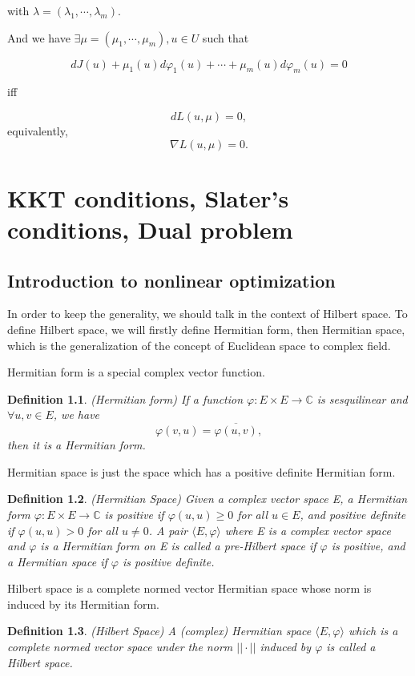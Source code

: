\documentclass[a4paper]{report}
\newtheorem{definition}{Definition}[section]
\begin{document}
with $\lambda=(\lambda_1,\cdots,\lambda_m)$. 

And we have $\exists \mu=(\mu_1,\cdots,\mu_m), u\in U$ such that

\[
    dJ(u)+\mu_1(u)d\varphi_1(u)+\cdots+\mu_m(u)d\varphi_m(u)=0
\]

iff

\[
    dL(u,\mu)=0,
\]
equivalently,
\[
    \nabla L(u,\mu)=0.
\]


\chapter{KKT conditions, Slater's conditions, Dual problem}
\section{Introduction to nonlinear optimization}
In order to keep the generality, we should talk in the context of Hilbert space. To define Hilbert space, we will firstly define Hermitian form, then Hermitian space, which is the generalization of the concept of Euclidean space to complex field.

Hermitian form is a special complex vector function.
\begin{definition}
    (Hermitian form\cite{gallier2019algebra}) If a function $\varphi :E\times E\to \mathbb C$ is sesquilinear and $\forall u,v\in E$, we have 
    \[
        \varphi(v,u)=\overline{\varphi(u,v)},
    \]
    then it is a Hermitian form.
\end{definition}

Hermitian space is just the space which has a positive definite Hermitian form.

\begin{definition}
    (Hermitian Space\cite{gallier2019algebra}) Given a complex vector space E, a Hermitian form $\varphi:E\times E\to \mathbb C$ is positive if $\varphi(u,u)\geq 0$ for all $u\in E$, and positive definite if $\varphi(u,u)>0$ for all $u\neq 0$. A pair $\langle E,\varphi \rangle$ where E is a complex vector space and $\varphi$ is a Hermitian form on E is called a pre-Hilbert space if $\varphi$ is positive, and a Hermitian space if $\varphi$ is positive definite.
\end{definition}

Hilbert space is a complete normed vector Hermitian space whose norm is induced by its Hermitian form.

\begin{definition}
    (Hilbert Space\cite{gallier2019algebra}) A (complex) Hermitian space $\langle E,\varphi \rangle$ which is a complete normed vector space under the norm $||\cdot||$ induced by $\varphi$ is called a Hilbert space.
\end{definition}
\end{document}
